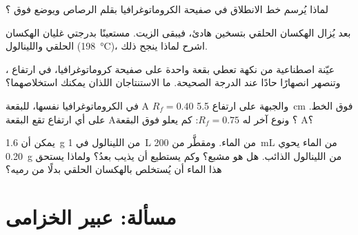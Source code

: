 \begin{exercise}[$\star\star$]\label{exo:g10:chemical-species:11}
لماذا يُرسم خط الانطلاق في صفيحة الكروماتوغرافيا بقلم الرصاص ويوضع فوق
؟
\end{exercise}

\begin{exercise}[$\star\star\star$]\label{exo:g10:chemical-species:12}
بعد  يُزال الهكسان الحلقي بتسخين هادئ، فيبقى الزيت. مستعينًا بدرجتي
غليان الهكسان الحلقي واللينالول (\qty{198}{\celsius})، اشرح
لماذا ينجح ذلك.
\end{exercise}

\begin{exercise}[$\star\star\star$]\label{exo:g10:chemical-species:13}
عيّنة اصطناعية من نكهة تعطي بقعة واحدة على صفيحة كروماتوغرافيا، في ارتفاع
، وتنصهر انصهارًا حادًا عند الدرجة الصحيحة. ما الاستنتاجان
اللذان يمكنك استخلاصهما؟
\end{exercise}

\begin{exercise}[$\star\star\star$]\label{exo:g10:chemical-species:14}
في الكروماتوغرافيا نفسها، للبقعة A $R_f = 0.40$ والجبهة على ارتفاع \qty{5.5}{cm}
فوق الخط. على أي ارتفاع تقع البقعة A؟ ونوع آخر له
$R_f = 0.75$: كم يعلو فوق البقعة A؟
\end{exercise}

\begin{exercise}[$\star\star\star$]\label{exo:g10:chemical-species:15}
يمكن أن  \qty{1.6}{g} من اللينالول في \qty{1}{L} من الماء. ومقطَّر
من \qty{200}{mL} من الماء يحوي \qty{0.20}{g} من اللينالول الذائب. هل هو
مشبع؟ وكم يستطيع أن يذيب بعدُ؟ ولماذا يستحق هذا الماء أن يُستخلص بالهكسان
الحلقي بدلًا من رميه؟
\end{exercise}

\clearpage %
\section{مسألة: عبير الخزامى}

